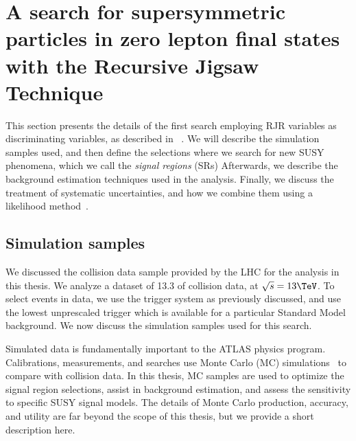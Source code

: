 

\chapter[A search for supersymmetric particles in zero lepton final states with the Recursive Jigsaw Technique][Top of Page Title]{A search for supersymmetric particles in zero lepton final states with the Recursive Jigsaw Technique}

This section presents the details of the first search employing RJR variables as discriminating variables, as described in ~\cite{ATLAS-CONF-2016-078}.
We will describe the simulation samples used, and then define the selections where we search for new SUSY phenomena, which we call the \textit{signal regions} (SRs)
Afterwards, we describe the background estimation techniques used in the analysis.
Finally, we discuss the treatment of systematic uncertainties, and how we combine them using a likelihood method~\cite{Baak:2014wma}.

\section{Simulation samples}

We discussed the collision data sample provided by the LHC for the analysis in this thesis.
We analyze a dataset of 13.3 \ifb of collision data, at $\sqrt{s} = 13 \TeV$.
To select events in data, we use the trigger system as previously discussed, and use the lowest unprescaled trigger which is available for a particular Standard Model background.
We now discuss the simulation samples used for this search.

Simulated data is fundamentally important to the ATLAS physics program.
Calibrations, measurements, and searches use Monte Carlo (MC) simulations\footnotemark~ to compare with collision data.
In this thesis, MC samples are used to optimize the signal region selections, assist in background estimation, and assess the sensitivity to specific SUSY signal models.
The details of Monte Carlo production, accuracy, and utility are far beyond the scope of this thesis, but we provide a short description here.

